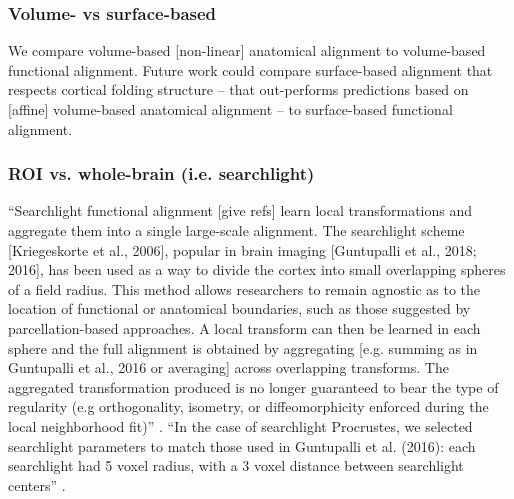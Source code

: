 


\subsubsection{Volume- vs surface-based}



We compare volume-based [non-linear] anatomical alignment to volume-based
functional alignment.
%
Future work could compare surface-based alignment that respects cortical folding
structure -- that out-performs predictions based on [affine] volume-based
anatomical alignment \citep{weiner2018defining} -- to surface-based functional
alignment.



\subsubsection{ROI vs. whole-brain (i.e. searchlight)}




``Searchlight functional alignment [give refs] learn local transformations and
aggregate them into a single large-scale alignment.
%
The searchlight scheme [Kriegeskorte et al., 2006], popular in brain imaging
[Guntupalli et al., 2018; 2016], has been used as a way to divide the cortex
into small overlapping spheres of a field radius.
%
This method allows researchers to remain agnostic as to the location of
functional or anatomical boundaries, such as those suggested by
parcellation-based approaches.
%
A local transform can then be learned in each sphere and the full alignment is
obtained by aggregating [e.g. summing as in Guntupalli et al., 2016 or
averaging] across overlapping transforms.
%
The aggregated transformation produced is no longer guaranteed to bear the type
of regularity (e.g orthogonality, isometry, or diffeomorphicity enforced during
the local neighborhood fit)'' \citep{bazeille2021empirical}.
%
``In the case of searchlight Procrustes, we selected searchlight parameters to
match those used in Guntupalli et al. (2016):
%
each searchlight had 5 voxel radius, with a 3 voxel distance between searchlight
centers'' \citep{bazeille2021empirical}.


